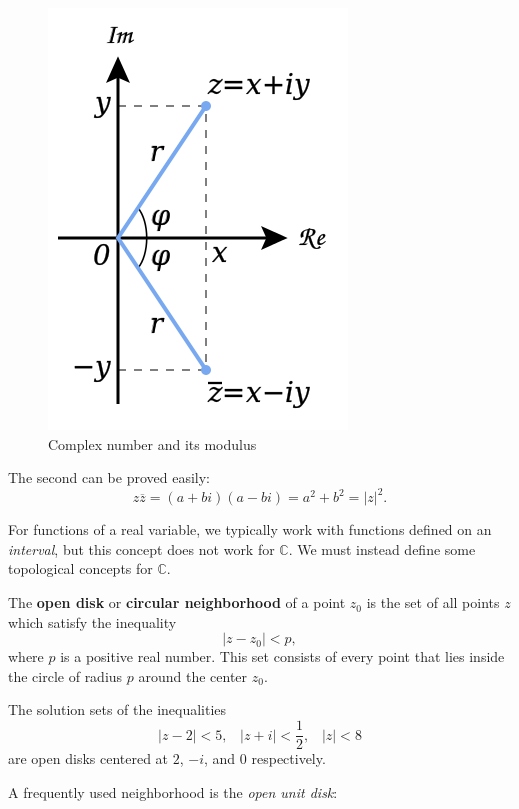 \begin{example}
\begin{itemize}
\begin{figure}[h]
\centering
\includegraphics[scale=0.4]{images/complexmod.png}
\caption{Complex number and its modulus\cite{modulusimage}}
\end{figure}

The second can be proved easily:
\[z\overbar{z} = (a+bi)(a-bi) = a^2 + b^2 = |z|^2.\]
\end{itemize}
\end{example}

For functions of a real variable, we typically work with functions defined on an \textit{interval}, but this concept does not work for $\mathbb{C}$.  We must instead define some topological concepts for $\mathbb{C}$.

\begin{defn}
The \textbf{open disk} or \textbf{circular neighborhood} of a point $z_0$ is the set of all points $z$ which satisfy the inequality
\[|z-z_0| < p,\]
where $p$ is a positive real number.  This set consists of every point that lies inside the circle of radius $p$ around the center $z_0$.
\end{defn}

\begin{example}
The solution sets of the inequalities
\[|z-2| < 5, \;\;\; |z+i| < \frac{1}{2}, \;\;\; |z| < 8\]
are open disks centered at $2$, $-i$, and $0$ respectively.
\end{example}

A frequently used neighborhood is the \textit{open unit disk}:

